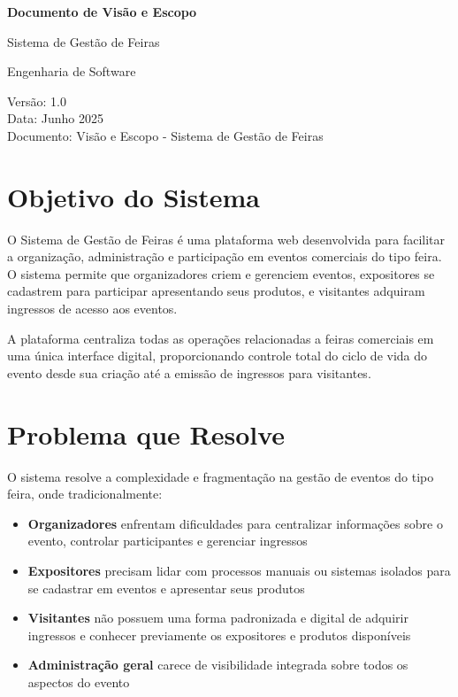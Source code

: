 \documentclass[12pt,a4paper]{article}
\begin{document}
\begin{titlepage}
\centering
\vspace*{2cm}

{\Huge\bfseries Documento de Visão e Escopo}

\vspace{0.5cm}

{\LARGE Sistema de Gestão de Feiras}

\vspace{2cm}

{\large Engenharia de Software}

\vfill

{\large Versão: 1.0\\
Data: Junho 2025\\
Documento: Visão e Escopo - Sistema de Gestão de Feiras}

\end{titlepage}

\newpage
\tableofcontents
\newpage

\section{Objetivo do Sistema}

O Sistema de Gestão de Feiras é uma plataforma web desenvolvida para facilitar a organização, administração e participação em eventos comerciais do tipo feira. O sistema permite que organizadores criem e gerenciem eventos, expositores se cadastrem para participar apresentando seus produtos, e visitantes adquiram ingressos de acesso aos eventos.

A plataforma centraliza todas as operações relacionadas a feiras comerciais em uma única interface digital, proporcionando controle total do ciclo de vida do evento desde sua criação até a emissão de ingressos para visitantes.

\section{Problema que Resolve}

O sistema resolve a complexidade e fragmentação na gestão de eventos do tipo feira, onde tradicionalmente:

\begin{itemize}
    \item \textbf{Organizadores} enfrentam dificuldades para centralizar informações sobre o evento, controlar participantes e gerenciar ingressos
    \item \textbf{Expositores} precisam lidar com processos manuais ou sistemas isolados para se cadastrar em eventos e apresentar seus produtos
    \item \textbf{Visitantes} não possuem uma forma padronizada e digital de adquirir ingressos e conhecer previamente os expositores e produtos disponíveis
    \item \textbf{Administração geral} carece de visibilidade integrada sobre todos os aspectos do evento
\end{itemize}
\end{document}
